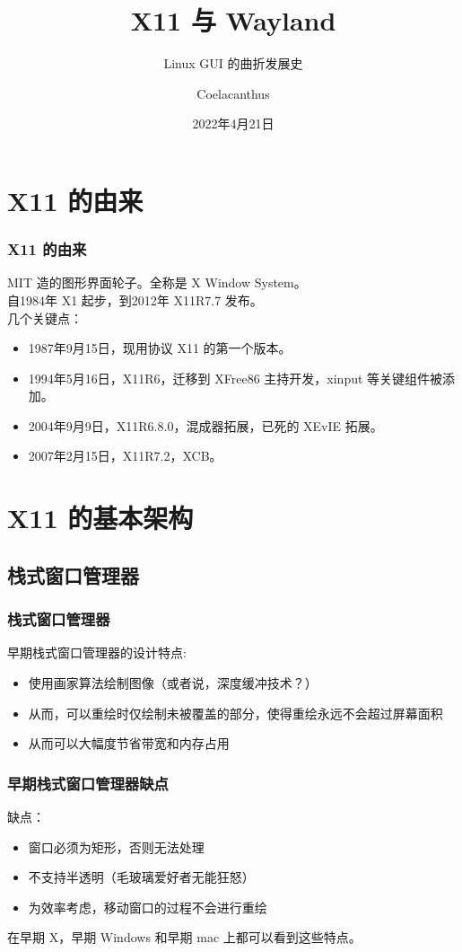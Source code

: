 \documentclass[UTF-8]{ctexbeamer}
\title{X11 与 Wayland}
\subtitle{Linux GUI 的曲折发展史}
\author{Coelacanthus}
\date{2022年4月21日}
\begin{document}
\frame{\titlepage}

\section{X11 的由来}
\begin{frame}
	\frametitle{X11 的由来}
	MIT 造的图形界面轮子。全称是 X Window System。\\
	自1984年 X1 起步，到2012年 X11R7.7 发布。\\
	几个关键点：
	\begin{itemize}
		\item 1987年9月15日，现用协议 X11 的第一个版本。
		\item 1994年5月16日，X11R6，迁移到 XFree86 主持开发，xinput 等关键组件被添加。
		\item 2004年9月9日，X11R6.8.0，混成器拓展，已死的 XEvIE 拓展。
		\item 2007年2月15日，X11R7.2，XCB。
	\end{itemize}

\end{frame}

\section{X11 的基本架构}
\subsection{栈式窗口管理器}
\begin{frame}[fragile]
	\frametitle{栈式窗口管理器}
	早期栈式窗口管理器的设计特点:
	\begin{itemize}
		\item 使用画家算法绘制图像（或者说，深度缓冲技术？）
		\item 从而，可以重绘时仅绘制未被覆盖的部分，使得重绘永远不会超过屏幕面积
		\item 从而可以大幅度节省带宽和内存占用
	\end{itemize}
	
\end{frame}
\begin{frame}[fragile]
	\frametitle{早期栈式窗口管理器缺点}
	缺点：
	\begin{itemize}
		\item 窗口必须为矩形，否则无法处理
		\item 不支持半透明（毛玻璃爱好者无能狂怒）
		\item 为效率考虑，移动窗口的过程不会进行重绘
	\end{itemize}
	
	在早期 X，早期 Windows 和早期 mac 上都可以看到这些特点。
	
\end{frame}
\end{document}
